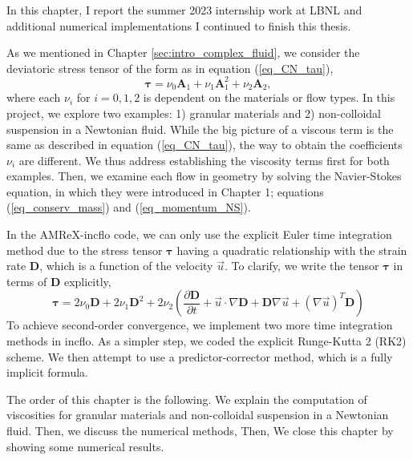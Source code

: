 \par
In this chapter, I report the summer 2023 internship work at LBNL and additional numerical implementations I continued to finish this thesis.

As we mentioned in Chapter \ref{sec:intro_complex_fluid}, we consider the deviatoric stress tensor of the form as in equation (\ref{eq_CN_tau}), 
\begin{equation}
  \boldsymbol{\tau} =
  \nu_0  \bm{A}_1 +  \nu_1  \bm{A}_1^2 + \nu_2 \bm{A}_2 ,
\nonumber
\end{equation}
where each $\nu_i$ for $i = 0,1,2$ is dependent on the materials or flow types. In this project, we explore two examples: 1) granular materials and 2) non-colloidal suspension in a Newtonian fluid. While the big picture of a viscous term is the same as described in equation (\ref{eq_CN_tau}), the way to obtain the coefficients $\nu_i$ are different. We thus address establishing the viscosity terms first for both examples. Then, we examine each flow in geometry by solving the Navier-Stokes equation,
in which they were introduced in Chapter 1; equations (\ref{eq_conserv_mass}) and (\ref{eq_momentum_NS}).
\par
In the AMReX-incflo code, we can only use the explicit Euler time integration method due to the stress tensor $\bm{\tau}$ having a quadratic relationship with the strain rate $\bm{D}$, which is a function of the velocity $\vec{u}$. 
To clarify, we write the tensor $\bm{\tau}$ in terms of $\bm{D}$ explicitly,
\begin{equation}
  \boldsymbol{\tau} =
  2 \nu_0  \bm{D} +  2 \nu_1  \bm{D}^2 
  + 2\nu_2 \left(
    \frac{\partial \bm{D}}{\partial t} + 
     \vec{u} \cdot \nabla \bm{D}
    +\bm{D} \nabla \vec{u}+ \left(\nabla \vec{u} \right)^T \bm{D} 
   \right)
\end{equation}
To achieve second-order convergence, we implement two more time integration methods in incflo. As a simpler step, we coded the explicit Runge-Kutta 2 (RK2) scheme. We then attempt to use a predictor-corrector method, which is a fully implicit formula.
\par
The order of this chapter is the following. We explain the computation of viscosities for granular materials and non-colloidal suspension in a Newtonian fluid. Then, we discuss the numerical methods,   Then,  We close this chapter by showing some numerical results.

